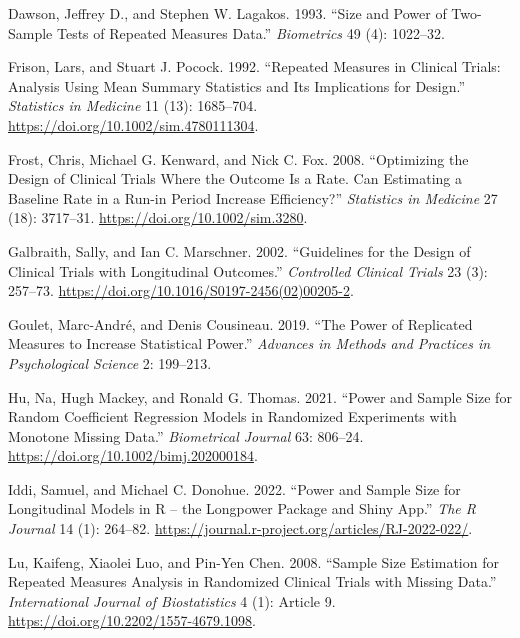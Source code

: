 \documentclass[
  11pt,
]{article}
\newlength{\cslhangindent}
\newenvironment{CSLReferences}[2] %
 {\begin{list}{}{%
  \setlength{\itemindent}{0pt}
  \setlength{\leftmargin}{0pt}
  \setlength{\parsep}{0pt}
  \ifodd #1
   \setlength{\leftmargin}{\cslhangindent}
   \setlength{\itemindent}{-1\cslhangindent}
  \fi
  \setlength{\itemsep}{#2\baselineskip}}}
 {\end{list}}
\begin{document}
\protect{}\label{refs}
\begin{CSLReferences}{1}{1}
Dawson, Jeffrey D., and Stephen W. Lagakos. 1993. {``Size and Power of
Two-Sample Tests of Repeated Measures Data.''} \emph{Biometrics} 49 (4):
1022--32.

Frison, Lars, and Stuart J. Pocock. 1992. {``Repeated Measures in
Clinical Trials: Analysis Using Mean Summary Statistics and Its
Implications for Design.''} \emph{Statistics in Medicine} 11 (13):
1685--704. \url{https://doi.org/10.1002/sim.4780111304}.

Frost, Chris, Michael G. Kenward, and Nick C. Fox. 2008. {``Optimizing
the Design of Clinical Trials Where the Outcome Is a Rate. {Can}
Estimating a Baseline Rate in a Run-in Period Increase Efficiency?''}
\emph{Statistics in Medicine} 27 (18): 3717--31.
\url{https://doi.org/10.1002/sim.3280}.

Galbraith, Sally, and Ian C. Marschner. 2002. {``Guidelines for the
Design of Clinical Trials with Longitudinal Outcomes.''}
\emph{Controlled Clinical Trials} 23 (3): 257--73.
\url{https://doi.org/10.1016/S0197-2456(02)00205-2}.

Goulet, Marc-André, and Denis Cousineau. 2019. {``The Power of
Replicated Measures to Increase Statistical Power.''} \emph{Advances in
Methods and Practices in Psychological Science} 2: 199--213.

Hu, Na, Hugh Mackey, and Ronald G. Thomas. 2021. {``Power and Sample
Size for Random Coefficient Regression Models in Randomized Experiments
with Monotone Missing Data.''} \emph{Biometrical Journal} 63: 806--24.
\url{https://doi.org/10.1002/bimj.202000184}.

Iddi, Samuel, and Michael C. Donohue. 2022. {``Power and Sample Size for
Longitudinal Models in {R} -- the Longpower Package and {Shiny} App.''}
\emph{The R Journal} 14 (1): 264--82.
\url{https://journal.r-project.org/articles/RJ-2022-022/}.

Lu, Kaifeng, Xiaolei Luo, and Pin-Yen Chen. 2008. {``Sample Size
Estimation for Repeated Measures Analysis in Randomized Clinical Trials
with Missing Data.''} \emph{International Journal of Biostatistics} 4
(1): Article 9. \url{https://doi.org/10.2202/1557-4679.1098}.


\end{CSLReferences}
\end{document}
